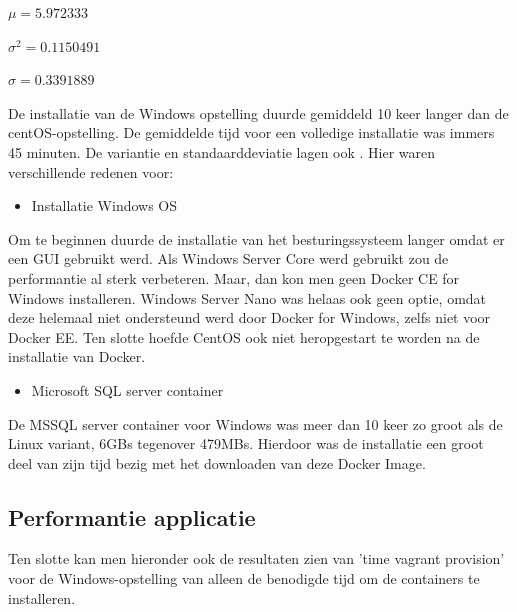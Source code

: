 $\mu = 5.972333$

$\sigma^2 = 0.1150491$

$\sigma = 0.3391889$

De installatie van de Windows opstelling duurde gemiddeld 10 keer langer dan de centOS-opstelling. De gemiddelde tijd voor een volledige installatie was immers 45 minuten. De variantie en standaarddeviatie lagen ook . Hier waren verschillende redenen voor:

\begin{itemize}[noitemsep]
	\item Installatie Windows OS
\end{itemize}

Om te beginnen duurde de installatie van het besturingssysteem langer omdat er een GUI gebruikt werd. Als Windows Server Core werd gebruikt zou de performantie al sterk verbeteren. Maar, dan kon men geen Docker CE for Windows installeren. Windows Server Nano was helaas ook geen optie, omdat deze helemaal niet ondersteund werd door Docker for Windows, zelfs niet voor Docker EE. Ten slotte hoefde CentOS ook niet heropgestart te worden na de installatie van Docker.

\begin{itemize}[noitemsep]
	\item Microsoft SQL server container
\end{itemize}

De MSSQL server container voor Windows was meer dan 10 keer zo groot als de Linux variant,  6GBs tegenover 479MBs. Hierdoor was de installatie een groot deel van zijn tijd bezig met het downloaden van deze Docker Image.

\subsection{Performantie applicatie}
Ten slotte kan men hieronder ook de resultaten zien van 'time vagrant provision' voor de Windows-opstelling van alleen de benodigde tijd om de containers te installeren.

